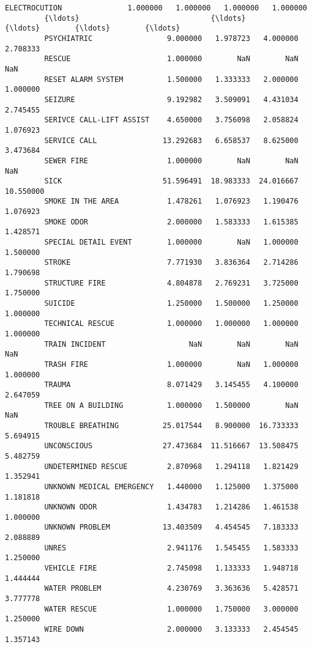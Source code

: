 \documentclass[11pt]{article}
\begin{document}
\begin{Verbatim}[commandchars=\\\{\}]
         ELECTROCUTION               1.000000   1.000000   1.000000   1.000000   
         {\ldots}                              {\ldots}        {\ldots}        {\ldots}        {\ldots}   
         PSYCHIATRIC                 9.000000   1.978723   4.000000   2.708333   
         RESCUE                      1.000000        NaN        NaN        NaN   
         RESET ALARM SYSTEM          1.500000   1.333333   2.000000   1.000000   
         SEIZURE                     9.192982   3.509091   4.431034   2.745455   
         SERIVCE CALL-LIFT ASSIST    4.650000   3.756098   2.058824   1.076923   
         SERVICE CALL               13.292683   6.658537   8.625000   3.473684   
         SEWER FIRE                  1.000000        NaN        NaN        NaN   
         SICK                       51.596491  18.983333  24.016667  10.550000   
         SMOKE IN THE AREA           1.478261   1.076923   1.190476   1.076923   
         SMOKE ODOR                  2.000000   1.583333   1.615385   1.428571   
         SPECIAL DETAIL EVENT        1.000000        NaN   1.000000   1.500000   
         STROKE                      7.771930   3.836364   2.714286   1.790698   
         STRUCTURE FIRE              4.804878   2.769231   3.725000   1.750000   
         SUICIDE                     1.250000   1.500000   1.250000   1.000000   
         TECHNICAL RESCUE            1.000000   1.000000   1.000000   1.000000   
         TRAIN INCIDENT                   NaN        NaN        NaN        NaN   
         TRASH FIRE                  1.000000        NaN   1.000000   1.000000   
         TRAUMA                      8.071429   3.145455   4.100000   2.647059   
         TREE ON A BUILDING          1.000000   1.500000        NaN        NaN   
         TROUBLE BREATHING          25.017544   8.900000  16.733333   5.694915   
         UNCONSCIOUS                27.473684  11.516667  13.508475   5.482759   
         UNDETERMINED RESCUE         2.870968   1.294118   1.821429   1.352941   
         UNKNOWN MEDICAL EMERGENCY   1.440000   1.125000   1.375000   1.181818   
         UNKNOWN ODOR                1.434783   1.214286   1.461538   1.000000   
         UNKNOWN PROBLEM            13.403509   4.454545   7.183333   2.088889   
         UNRES                       2.941176   1.545455   1.583333   1.250000   
         VEHICLE FIRE                2.745098   1.133333   1.948718   1.444444   
         WATER PROBLEM               4.230769   3.363636   5.428571   3.777778   
         WATER RESCUE                1.000000   1.750000   3.000000   1.250000   
         WIRE DOWN                   2.000000   3.133333   2.454545   1.357143   
         

\end{Verbatim}
\end{document}
